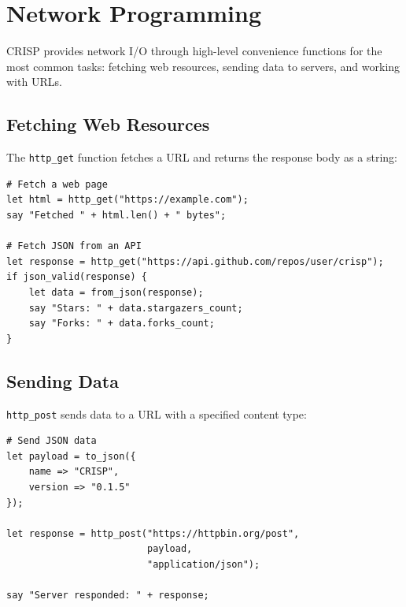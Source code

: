 \section{Network Programming}

CRISP provides network I/O through high-level convenience functions for the most common tasks: fetching web resources, sending data to servers, and working with URLs.

\subsection{Fetching Web Resources}

The \texttt{http\_get} function fetches a URL and returns the response body as a string:

\begin{tcolorbox}[colback=codebg, colframe=darkpurple, colbacktitle=darkpurple, title=\textbf{\textcolor{codegold}{HTTP GET}}, fonttitle=\bfseries, sharp corners]
\begin{lstlisting}
# Fetch a web page
let html = http_get("https://example.com");
say "Fetched " + html.len() + " bytes";

# Fetch JSON from an API
let response = http_get("https://api.github.com/repos/user/crisp");
if json_valid(response) {
    let data = from_json(response);
    say "Stars: " + data.stargazers_count;
    say "Forks: " + data.forks_count;
}
\end{lstlisting}
\end{tcolorbox}

\subsection{Sending Data}

\texttt{http\_post} sends data to a URL with a specified content type:

\begin{tcolorbox}[colback=codebg, colframe=darkpurple, colbacktitle=darkpurple, title=\textbf{\textcolor{codegold}{HTTP POST}}, fonttitle=\bfseries, sharp corners]
\begin{lstlisting}
# Send JSON data
let payload = to_json({
    name => "CRISP",
    version => "0.1.5"
});

let response = http_post("https://httpbin.org/post",
                         payload,
                         "application/json");

say "Server responded: " + response;
\end{lstlisting}
\end{tcolorbox}

